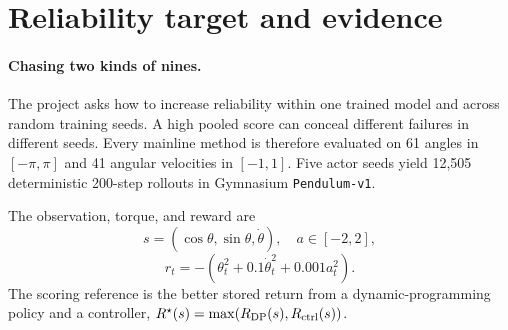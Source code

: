 \maketitle
\vspace{-1.5em}

\begin{abstract}
Reliable control should work across initial states and independent training seeds. We evaluate five actors on the same 2,501-state Pendulum grid. The selected reinforcement-learning-plus-supervision pipeline succeeds near the reference on 12,496 of 12,505 seed-state trials (99.928\%); the selected pure-RL pipeline reaches 12,008 (96.026\%). Their task-success rates are 93.858\% and 92.875\%, respectively, while pure RL shows more strict reference wins (22.823\% versus 12.555\%). The pure actor produces 1,267 failures; reflection and full-range critic search repair 770 of them. The remaining failures reveal two interacting mechanisms. Ordered reference actions repair 19.1\% of failures after one action and 99.0\% after 32 actions, showing that recovery often needs a coordinated sequence. FastSACN8 actors place 98.5\% of their failed actions near a torque bound, where clipping preserves only 7.1\% of a nominal local critic step. This motivates a search across the full torque interval. These results make pure RL alone unlikely to meet this reliability target and motivate a testable next recipe: supervised pre-training, reward-based RL refinement, and symmetry-based inductive bias.
\end{abstract}

\section{Reliability target and evidence}

\paragraph{Chasing two kinds of nines.}
The project asks how to increase reliability within one trained model and across random training seeds. A high pooled score can conceal different failures in different seeds. Every mainline method is therefore evaluated on 61 angles in $[-\pi,\pi]$ and 41 angular velocities in $[-1,1]$. Five actor seeds yield 12,505 deterministic 200-step rollouts in Gymnasium \texttt{Pendulum-v1}.

The observation, torque, and reward are
\[
s=(\cos\theta,\sin\theta,\dot\theta),\quad a\in[-2,2],
\]
\[
r_t=-(\theta_t^2+0.1\dot\theta_t^2+0.001a_t^2).
\]
The scoring reference is the better stored return from a dynamic-programming policy and a controller,
$R^\star(s)=\max(R_{\rm DP}(s),R_{\rm ctrl}(s))$.

